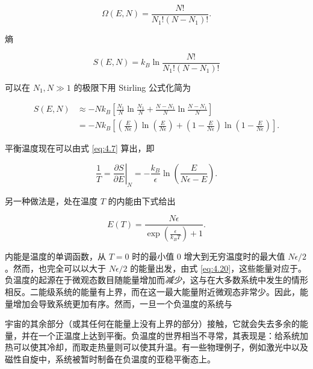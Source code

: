 \begin{equation}\label{eq:4.17}
  \Omega(E,N)=\frac{N!}{N_1!(N-N_1)!}.
\end{equation}

熵

\begin{equation}\label{eq:4.18}
  S(E,N)=k_B\ln\frac{N!}{N_1!(N-N_1)!}
\end{equation}

可以在 $N_1,N\gg1$ 的极限下用 Stirling 公式化简为

\begin{equation}\label{eq:4.19}
  \begin{aligned}
    S(E,N)&\approx-Nk_B\left[\frac{N_1}{N}\ln\frac{N_1}{N}+\frac{N-N_1}{N}\ln\frac{N-N_1}{N}\right]\\
    &=-Nk_B\left[\left(\frac{E}{N\epsilon}\right)\ln\left(\frac{E}{N\epsilon}\right)+\left(1-\frac{E}{N\epsilon}\right)\ln\left(1-\frac{E}{N\epsilon}\right)\right].
  \end{aligned}
\end{equation}

平衡温度现在可以由式 \eqref{eq:4.7} 算出，即

\begin{equation}\label{eq:4.20}
  \frac{1}{T}=\left.\frac{\partial S}{\partial E}\right|_N=-\frac{k_B}{\epsilon}\ln\left(\frac{E}{N\epsilon-E}\right).
\end{equation}


另一种做法是，处在温度 $T$ 的内能由下式给出

\begin{equation}\label{eq:4.21}
  E(T)=\frac{N\epsilon}{\exp\left(\frac{\epsilon}{k_BT}\right)+1}.
\end{equation}

内能是温度的单调函数，从 $T=0$ 时的最小值 0 增大到无穷温度时的最大值 $N\epsilon/2$。然而，也完全可以以大于 $N\epsilon/2$ 的能量出发，由式 \eqref{eq:4.20}，这些能量对应于。负温度的起源在于微观态数目随能量增加而\emph{减少}，这与在大多数系统中发生的情形相反。二能级系统的能量有上界，而在这一最大能量附近微观态非常少。因此，能量增加会导致系统更加有序。然而，一旦一个负温度的系统与

宇宙的其余部分（或其任何在能量上没有上界的部分）接触，它就会失去多余的能量，并在一个正温度上达到平衡。负温度的世界相当不寻常，其表现是：给系统加热可以使其冷却，而取走热量则可以使其升温。有一些物理例子，例如激光中以及磁性自旋中，系统被暂时制备在负温度的亚稳平衡态上。

